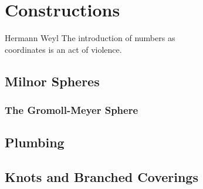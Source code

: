 \chapter{Constructions}\label{chap:constructions}

\begin{epigraph}{14em}{Hermann Weyl}
  The introduction of numbers as \\
  coordinates is an act of violence.
\end{epigraph}

\section{Milnor Spheres}\label{sec:milnor-spheres}
\cite{milnor1956manifolds}

\subsection{The Gromoll-Meyer Sphere}\label{sec:gromoll-meyer}
\cite{gromollmeyer1974curvature}

\section{Plumbing}\label{sec:plumbing}

\section{Knots and Branched Coverings}\label{sec:brieskorn}
\cite{milnor1968hypersurfaces}
\cite{kauffman1987knots}
